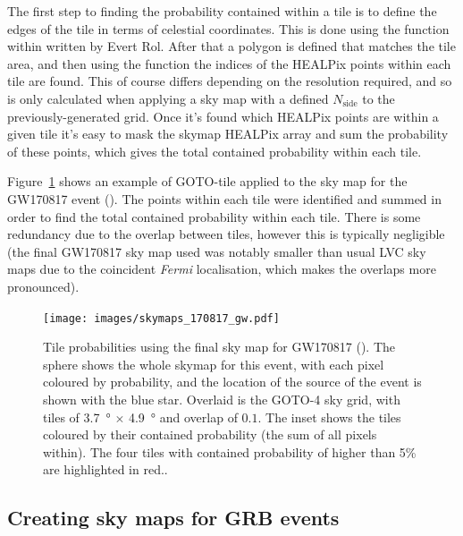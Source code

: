 \begin{colsection}
\begin{colsection}
The first step to finding the probability contained within a tile is to define the edges of the tile in terms of celestial coordinates. This is done using the  function within  written by Evert Rol. After that a polygon is defined that matches the tile area, and then using the   function the indices of the HEALPix points within each tile are found. This of course differs depending on the resolution required, and so is only calculated when applying a sky map with a defined $N_\text{side}$ to the previously-generated grid. Once it's found which HEALPix points are within a given tile it's easy to mask the skymap HEALPix array and sum the probability of these points, which gives the total contained probability within each tile.

Figure~\ref{fig:170817_gw} shows an example of GOTO-tile applied to the sky map for the GW170817 event (\cite{GW170817}). The points within each tile were identified and summed in order to find the total contained probability within each tile. There is some redundancy due to the overlap between tiles, however this is typically negligible (the final GW170817 sky map used was notably smaller than usual LVC sky maps due to the coincident \textit{Fermi} localisation, which makes the overlaps more pronounced).

\begin{figure}[p]
\begin{center}
\texttt{[image: images/skymaps\_170817\_gw.pdf]}
\end{center}
\caption[Tile probabilities for GW170817]{Tile probabilities using the final sky map for GW170817 (\cite{GW170817}). The sphere shows the whole skymap for this event, with each pixel coloured by probability, and the location of the source of the event is shown with the blue star. Overlaid is the GOTO-4 sky grid, with tiles of \SI{3.7}{\degree} $\times$ \SI{4.9}{\degree} and overlap of $0.1$. The inset shows the tiles coloured by their contained probability (the sum of all pixels within). The four tiles with contained probability of higher than 5\% are highlighted in red..
}
\label{fig:170817_gw}
\end{figure}

\newpage

\end{colsection}


\subsection{Creating sky maps for GRB events}
\label{sec:grb_skymaps}
\begin{colsection}


\end{colsection}
\end{colsection}

